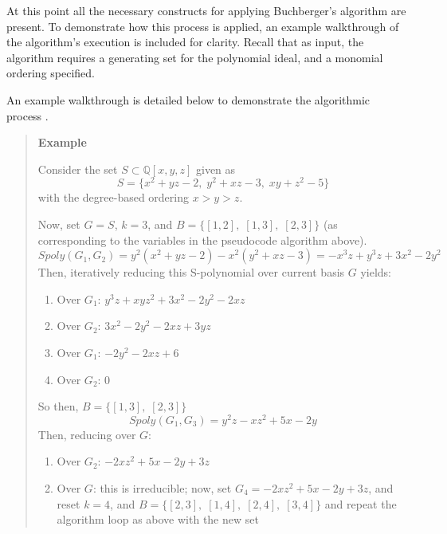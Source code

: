 \documentclass[letterpaper,12pt,titlepage,oneside,final]{book}
\newenvironment{example}{\begin{quote}%
  \textbf{Example }%
  \quad
}{%
\end{quote}%
}
\begin{document}
At this point all the necessary constructs for applying Buchberger's algorithm are present.  To demonstrate how this process is applied, an example walkthrough of the algorithm's execution is included for clarity.  Recall that as input, the algorithm requires a generating set for the polynomial ideal, and a monomial ordering specified.

An example walkthrough is detailed below to demonstrate the algorithmic process \cite{Geddes}.

\begin{example} 
  Consider the set ${S \subset \mathbb{Q}[x, y, z]}$ given as
  \begin{equation*}
    S = \{x^2 + yz - 2, \; y^2 + xz - 3, \; xy + z^2 - 5\}
  \end{equation*}
  with the degree-based ordering ${x > y > z}$.  

  Now, set ${G = S}$, ${k = 3}$, and ${B = \{[1, 2],\; [1, 3],\; [2, 3]\}}$ (as corresponding to the variables in the pseudocode algorithm above).  
  \begin{equation*}
    Spoly( G_1, G_2) = y^2(x^2 + yz - 2) - x^2(y^2 + xz - 3) = -x^3z + y^3z + 3x^2 -2y^2
  \end{equation*}
  Then, iteratively reducing this S-polynomial over current basis ${G}$ yields:\\ 
  \begin{enumerate}
    \item Over ${G_1}$: ${y^3z + xyz^2 + 3x^2 -2y^2 - 2xz}$
    \item Over ${G_2}$: ${3x^2 - 2y^2 - 2xz + 3yz}$
    \item Over ${G_1}$: ${-2y^2 - 2xz + 6}$
    \item Over ${G_2}$: 0
  \end{enumerate}
  So then, ${B = \{[1, 3],\; [2, 3]\}}$
  \begin{equation*}
    Spoly( G_1, G_3) = y^2z - xz^2 + 5x - 2y
  \end{equation*} 
  Then, reducing over ${G}$: 
  \begin{enumerate}
    \item Over ${G_2}$: ${-2xz^2 + 5x - 2y + 3z}$
    \item Over ${G}$: this is irreducible; now, set ${G_4 = -2xz^2 + 5x - 2y + 3z}$, and reset ${k = 4}$, and ${B = \{[2, 3],\; [1, 4],\; [2, 4],\; [3, 4]\}}$ and repeat the algorithm loop as above with the new set
  \end{enumerate}
  

\end{example}
\end{document}
